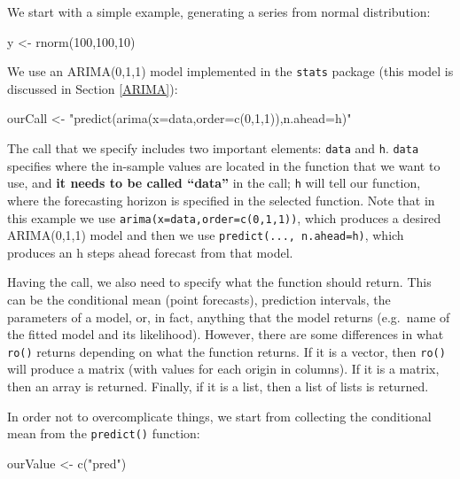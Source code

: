 \documentclass[
]{book}
\newenvironment{Shaded}{\begin{snugshade}}{\end{snugshade}}
\newcommand{\DecValTok}[1]{\textcolor[rgb]{0.00,0.00,0.81}{#1}}
\newcommand{\FunctionTok}[1]{\textcolor[rgb]{0.00,0.00,0.00}{#1}}
\newcommand{\NormalTok}[1]{#1}
\newcommand{\OtherTok}[1]{\textcolor[rgb]{0.56,0.35,0.01}{#1}}
\newcommand{\StringTok}[1]{\textcolor[rgb]{0.31,0.60,0.02}{#1}}
\theoremstyle{definition}
\theoremstyle{definition}
\theoremstyle{definition}
\theoremstyle{definition}
\theoremstyle{remark}
\begin{document}
We start with a simple example, generating a series from normal distribution:

\begin{Shaded}
\begin{Highlighting}[]
\NormalTok{y }\OtherTok{\textless{}{-}} \FunctionTok{rnorm}\NormalTok{(}\DecValTok{100}\NormalTok{,}\DecValTok{100}\NormalTok{,}\DecValTok{10}\NormalTok{)}
\end{Highlighting}
\end{Shaded}

We use an ARIMA(0,1,1) model implemented in the \texttt{stats} package (this model is discussed in Section \ref{ARIMA}):

\begin{Shaded}
\begin{Highlighting}[]
\NormalTok{ourCall }\OtherTok{\textless{}{-}} \StringTok{"predict(arima(x=data,order=c(0,1,1)),n.ahead=h)"}
\end{Highlighting}
\end{Shaded}

The call that we specify includes two important elements: \texttt{data} and \texttt{h}. \texttt{data} specifies where the in-sample values are located in the function that we want to use, and \textbf{it needs to be called ``data''} in the call; \texttt{h} will tell our function, where the forecasting horizon is specified in the selected function. Note that in this example we use \texttt{arima(x=data,order=c(0,1,1))}, which produces a desired ARIMA(0,1,1) model and then we use \texttt{predict(...,\ n.ahead=h)}, which produces an h steps ahead forecast from that model.

Having the call, we also need to specify what the function should return. This can be the conditional mean (point forecasts), prediction intervals, the parameters of a model, or, in fact, anything that the model returns (e.g.~name of the fitted model and its likelihood). However, there are some differences in what \texttt{ro()} returns depending on what the function returns. If it is a vector, then \texttt{ro()} will produce a matrix (with values for each origin in columns). If it is a matrix, then an array is returned. Finally, if it is a list, then a list of lists is returned.

In order not to overcomplicate things, we start from collecting the conditional mean from the \texttt{predict()} function:

\begin{Shaded}
\begin{Highlighting}[]
\NormalTok{ourValue }\OtherTok{\textless{}{-}} \FunctionTok{c}\NormalTok{(}\StringTok{"pred"}\NormalTok{)}
\end{Highlighting}
\end{Shaded}
\end{document}
